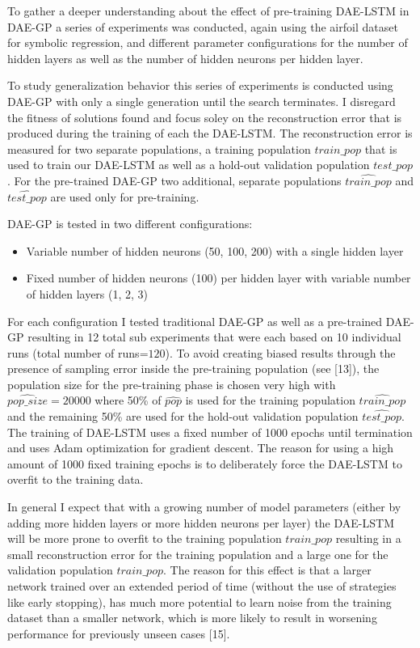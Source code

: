 \documentclass[
  11pt,
]{article}
\providecommand{\tightlist}{%
  \setlength{\itemsep}{0pt}\setlength{\parskip}{0pt}}
\begin{document}
To gather a deeper understanding about the effect of pre-training DAE-LSTM in DAE-GP a series of experiments was conducted, again using the airfoil dataset for symbolic regression, and different parameter configurations for the number of hidden layers as well as the number of hidden neurons per hidden layer.

To study generalization behavior this series of experiments is conducted using DAE-GP with only a single generation until the search terminates. I disregard the fitness of solutions found and focus soley on the reconstruction error that is produced during the training of each the DAE-LSTM. The reconstruction error is measured for two separate populations, a training population \(train\_pop\) that is used to train our DAE-LSTM as well as a hold-out validation population \(test\_pop\). For the pre-trained DAE-GP two additional, separate populations \(\hat{train\_pop}\) and \(\hat{test\_pop}\) are used only for pre-training.

DAE-GP is tested in two different configurations:

\begin{itemize}
\tightlist
\item
  Variable number of hidden neurons (50, 100, 200) with a single hidden layer
\item
  Fixed number of hidden neurons (100) per hidden layer with variable number of hidden layers (1, 2, 3)
\end{itemize}

For each configuration I tested traditional DAE-GP as well as a pre-trained DAE-GP resulting in 12 total sub experiments that were each based on 10 individual runs (total number of runs=\(120\)). To avoid creating biased results through the presence of sampling error inside the pre-training population (see {[}13{]}), the population size for the pre-training phase is chosen very high with \(\hat{pop\_size}=20000\) where 50\% of \(\hat{pop}\) is used for the training population \(\hat{train\_pop}\) and the remaining 50\% are used for the hold-out validation population \(\hat{test\_pop}\). The training of DAE-LSTM uses a fixed number of 1000 epochs until termination and uses Adam optimization for gradient descent. The reason for using a high amount of 1000 fixed training epochs is to deliberately force the DAE-LSTM to overfit to the training data.

In general I expect that with a growing number of model parameters (either by adding more hidden layers or more hidden neurons per layer) the DAE-LSTM will be more prone to overfit to the training population \(train\_pop\) resulting in a small reconstruction error for the training population and a large one for the validation population \(train\_pop\). The reason for this effect is that a larger network trained over an extended period of time (without the use of strategies like early stopping), has much more potential to learn noise from the training dataset than a smaller network, which is more likely to result in worsening performance for previously unseen cases {[}15{]}.
\end{document}
